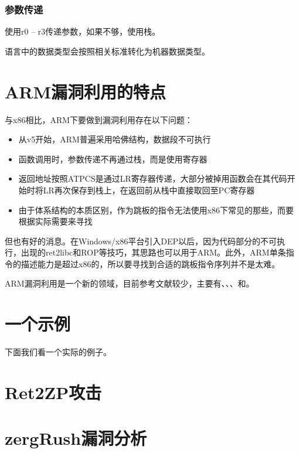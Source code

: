 \subsubsection{参数传递}

使用r0 – r3传递参数，如果不够，使用栈。

语言中的数据类型会按照相关标准转化为机器数据类型。
\section{ARM漏洞利用的特点}
与x86相比，ARM下要做到漏洞利用存在以下问题：
\begin{itemize}
\item 从v5开始，ARM普遍采用哈佛结构，数据段不可执行
\item 函数调用时，参数传递不再通过栈，而是使用寄存器
\item 返回地址按照ATPCS是通过LR寄存器传递，大部分被掉用函数会在其代码开始时将LR再次保存到栈上，在返回前从栈中直接取回至PC寄存器
\item 由于体系结构的本质区别，作为跳板的指令无法使用x86下常见的那些，而要根据实际需要来寻找
\end{itemize}
但也有好的消息。在Windows/x86平台引入DEP以后，因为代码部分的不可执行，出现的ret2libc和ROP等技巧，其思路也可以用于ARM。此外，ARM单条指令的描述能力是超过x86的，所以要寻找到合适的跳板指令序列并不是太难。

ARM漏洞利用是一个新的领域，目前参考文献较少，主要有\cite{arm_exploiting_linux}、\cite{arm_stack_exploitation}、\cite{arm_exploitation}、\cite{arm_ropmap}和\cite{arm_alphanumeric}。
\section{一个示例}
下面我们看一个实际的例子。
\section{Ret2ZP攻击}
\section{zergRush漏洞分析}
